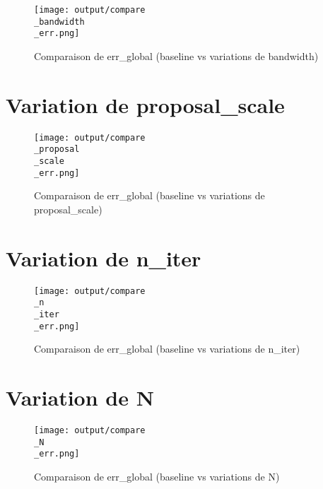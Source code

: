 \documentclass[11pt,a4paper]{article}
\begin{document}
\begin{figure}[H]

  \centering

  \texttt{[image: output/compare\\\_bandwidth\\\_err.png]}

  \caption{Comparaison de err\_global (baseline vs variations de bandwidth)}

\end{figure}


\section*{Variation de proposal\_scale}





\begin{figure}[H]

  \centering

  \texttt{[image: output/compare\\\_proposal\\\_scale\\\_err.png]}

  \caption{Comparaison de err\_global (baseline vs variations de proposal\_scale)}

\end{figure}


\section*{Variation de n\_iter}





\begin{figure}[H]

  \centering

  \texttt{[image: output/compare\\\_n\\\_iter\\\_err.png]}

  \caption{Comparaison de err\_global (baseline vs variations de n\_iter)}

\end{figure}


\section*{Variation de N}





\begin{figure}[H]

  \centering

  \texttt{[image: output/compare\\\_N\\\_err.png]}

  \caption{Comparaison de err\_global (baseline vs variations de N)}

\end{figure}
\end{document}
